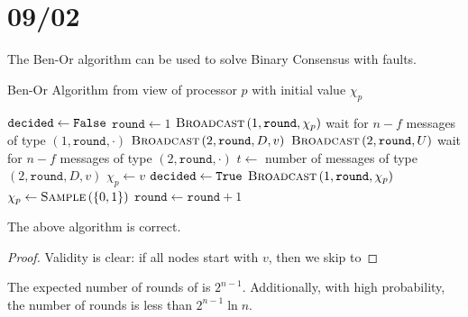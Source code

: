 \section{09/02}
The Ben-Or algorithm can be used to solve Binary Consensus with faults.
\begin{algorithm}
    \caption[]{Ben-Or Algorithm from view of processor $p$ with initial value $\chi_p$}
    \label{alg:ben-or}
    \begin{algorithmic}[1]
            \State $\texttt{decided} \gets \texttt{False}$
            \State $\texttt{round} \gets 1$
                \State $\Call{Broadcast}{1, \texttt{round}, \chi_p}$
                \State wait for $n - f$ messages of type $(1, \texttt{round}, \cdot)$
                    \State $\Call{Broadcast}{2, \texttt{round}, D, v}$
                \Else
                    \State $\Call{Broadcast}{2, \texttt{round}, U}$
                \EndIf
                \State wait for $n - f$ messages of type $(2, \texttt{round}, \cdot)$
                \State $t \gets$ number of messages of type $(2, \texttt{round}, D, v)$
                    \State $\chi_p \gets v$
                        \State $\texttt{decided} \gets \texttt{True}$
                        \State $\Call{Broadcast}{1, \texttt{round}, \chi_p}$
                    \EndIf
                \Else {}
                    \State $\chi_p \gets \Call{Sample}{\set{0,1}}$
                \EndIf
                \State $\texttt{round} \gets \texttt{round} + 1$
            \EndWhile
        \EndProcedure
    \end{algorithmic}
\end{algorithm}
\begin{theorem}{}{}
    The above algorithm is correct.
\end{theorem}

\begin{proof}
    Validity is clear: if all nodes start with $v$, then we skip to 
\end{proof}

\begin{theorem}{}{}
    The expected number of rounds of  is $2^{n-1}$.
    Additionally, with high probability, the number of rounds is less than
    $2^{n-1}\ln{n}$.
\end{theorem}